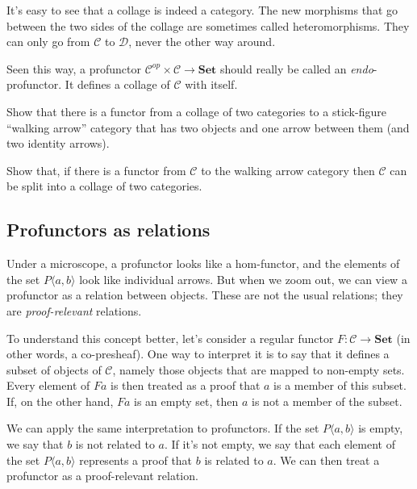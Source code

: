 \documentclass[DaoFP]{subfiles}
\begin{document}
It's easy to see that a collage is indeed a category. The new morphisms that go between the two sides of the collage are sometimes called heteromorphisms. They can only go from $\mathcal{C}$ to $\mathcal{D}$, never the other way around. 

Seen this way, a profunctor $ \mathcal{C}^{op} \times  \mathcal{C} \to \mathbf{Set}$ should really be called an \emph{endo}-profunctor. It defines a collage of $\mathcal{C}$ with itself.

\begin{exercise}
Show that there is a functor from a collage of two categories to a stick-figure ``walking arrow'' category that has two objects and one arrow between them (and two identity arrows).
\end{exercise}
\begin{exercise}
Show that, if there is a functor from $\mathcal{C}$ to the walking arrow category then $\mathcal{C}$ can be split into a collage of two categories. 
\end{exercise}

\subsection{Profunctors as relations}

Under a microscope, a profunctor looks like a hom-functor, and the elements of the set $P \langle a, b \rangle$ look like individual arrows. But when we zoom out, we can view a profunctor as a relation between objects. These are not the usual relations; they are \emph{proof-relevant} relations.

To understand this concept better, let's consider a regular functor $F \colon \mathcal{C} \to \mathbf{Set}$ (in other words, a co-presheaf). One way to interpret it is to say that it defines a  subset of objects of $\mathcal{C}$, namely those objects that are mapped to non-empty sets. Every element of $F a$ is then treated as a proof that $a$ is a member of this subset. If, on the other hand, $F a$ is an empty set, then $a$ is not a member of the subset.

We can apply the same interpretation to profunctors. If the set $P \langle a, b \rangle$ is empty, we say that $b$ is not related to $a$. If it's not empty, we say that each element of the set $P \langle a, b \rangle$ represents a proof that $b$ is related to $a$. We can then treat a profunctor as a proof-relevant relation. 
\end{document}
